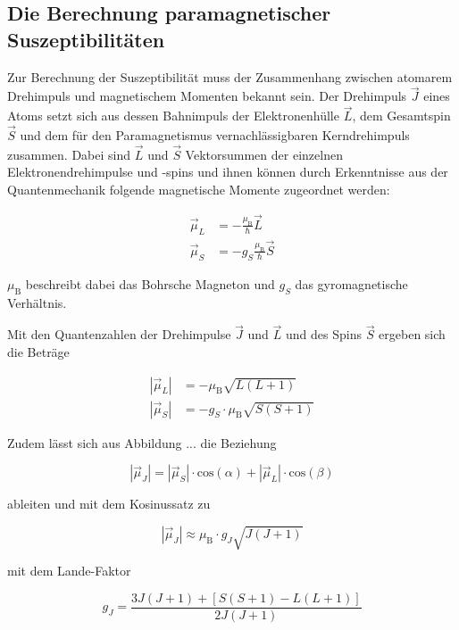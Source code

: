 \subsection{Die Berechnung paramagnetischer Suszeptibilitäten}

Zur Berechnung der Suszeptibilität muss der Zusammenhang zwischen atomarem Drehimpuls
und magnetischem Momenten bekannt sein. Der Drehimpuls $\vec{J}$ eines Atoms setzt sich
aus dessen Bahnimpuls der Elektronenhülle $\vec{L}$, dem Gesamtspin $\vec{S}$
und dem für den Paramagnetismus vernachlässigbaren Kerndrehimpuls zusammen.
Dabei sind $\vec{L}$ und $\vec{S}$ Vektorsummen der einzelnen Elektronendrehimpulse
und -spins und ihnen können durch Erkenntnisse aus der Quantenmechanik folgende
magnetische Momente zugeordnet werden:

\begin{align}
    \vec{\mu}_L &= - \frac{\mu_\text{B}}{\hbar} \vec{L} \\
    \vec{\mu}_S &= - g_S \frac{\mu_\text{B}}{\hbar} \vec{S}
\end{align}

$\mu_\text{B}$ beschreibt dabei das Bohrsche Magneton und $g_S$ das
gyromagnetische Verhältnis.

Mit den Quantenzahlen der Drehimpulse $\vec{J}$ und $\vec{L}$ und des Spins $\vec{S}$
ergeben sich die Beträge

\begin{align}
    |\vec{\mu}_L| &= - \mu_\text{B} \sqrt{L\left(L+1\right)}\\
    |\vec{\mu}_S| &= - g_S \cdot \mu_\text{B} \sqrt{S\left(S+1\right)}
\end{align}

Zudem lässt sich aus Abbildung ... die Beziehung

\begin{equation}
    |\vec{\mu}_J| = |\vec{\mu}_S| \cdot \text{cos}\left(\alpha \right) + 
    |\vec{\mu}_L| \cdot \text{cos}\left(\beta \right)
\end{equation}

ableiten und mit dem Kosinussatz zu 

\begin{equation}
    |\vec{\mu}_J| \approx \mu_\text{B} \cdot g_J \sqrt{J\left(J+1\right)}
\end{equation}

mit dem Lande-Faktor 

\begin{equation}
    g_J = \frac{3J(J+1) + [S(S+1) - L(L+1)]} {2 J(J+1)}
\end{equation}

